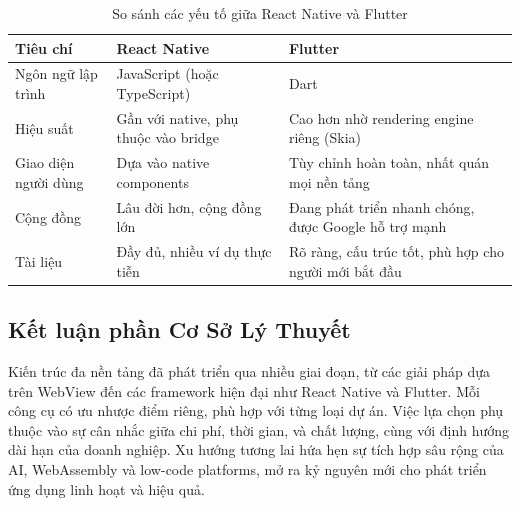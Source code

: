 \begin{flushleft}
    \begin{table}[H]
        \centering
        \begin{tabular}{|l|p{6cm}|p{6cm}|}
            \hline
            \textbf{Tiêu chí} & \textbf{React Native} & \textbf{Flutter} \\
            \hline
            Ngôn ngữ lập trình & JavaScript (hoặc TypeScript) & Dart \\
            \hline
            Hiệu suất & Gần với native, phụ thuộc vào bridge & Cao hơn nhờ rendering engine riêng (Skia) \\
            \hline
            Giao diện người dùng & Dựa vào native components & Tùy chỉnh hoàn toàn, nhất quán mọi nền tảng \\
            \hline
            Cộng đồng & Lâu đời hơn, cộng đồng lớn & Đang phát triển nhanh chóng, được Google hỗ trợ mạnh \\
            \hline
            Tài liệu & Đầy đủ, nhiều ví dụ thực tiễn & Rõ ràng, cấu trúc tốt, phù hợp cho người mới bắt đầu \\
            \hline
        \end{tabular}
        \caption{So sánh các yếu tố giữa React Native và Flutter}
    \end{table}
\end{flushleft}

\subsection{Kết luận phần Cơ Sở Lý Thuyết}
\renewcommand{\labelitemi}{--}    
    \begin{flushleft}
        \hspace*{0.8cm}Kiến trúc đa nền tảng đã phát triển qua nhiều giai đoạn, từ các giải pháp dựa trên WebView đến các framework hiện đại như React Native và Flutter. Mỗi công cụ có ưu nhược điểm riêng, phù hợp với từng loại dự án. Việc lựa chọn phụ thuộc vào sự cân nhắc giữa chi phí, thời gian, và chất lượng, cùng với định hướng dài hạn của doanh nghiệp. Xu hướng tương lai hứa hẹn sự tích hợp sâu rộng của AI, WebAssembly và low-code platforms, mở ra kỷ nguyên mới cho phát triển ứng dụng linh hoạt và hiệu quả.
    \end{flushleft}